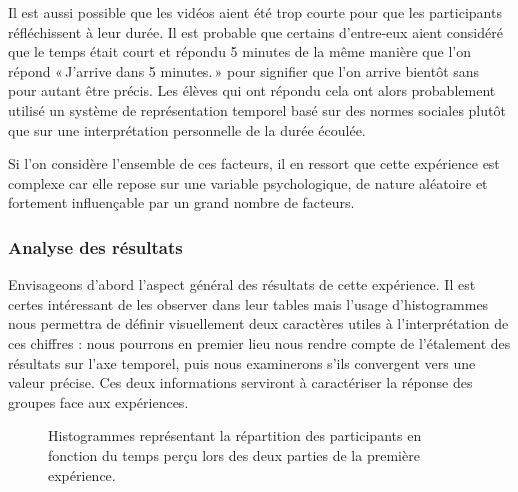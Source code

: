 \documentclass[12pt,fleqn,oneside,openany]{book} %
\begin{document}
Il est aussi possible que les vidéos aient été trop courte pour que les participants réfléchissent à leur durée. Il est probable que certains d'entre-eux aient considéré que le temps était court et répondu 5 minutes de la même manière que l'on répond «\,J'arrive dans 5 minutes.\,» pour signifier que l'on arrive bientôt sans pour autant être précis. Les élèves qui ont répondu cela ont alors probablement utilisé un système de représentation temporel basé sur des normes sociales plutôt que sur une interprétation personnelle de la durée écoulée.

Si l'on considère l'ensemble de ces facteurs, il en ressort que cette expérience est complexe car elle repose sur une variable psychologique, de nature aléatoire et fortement influençable par un grand nombre de facteurs.



\subsubsection{Analyse des résultats} \label{sssec:analyseResult1.1}
Envisageons d'abord l'aspect général des résultats de cette expérience. Il est certes intéressant de les observer dans leur tables mais l'usage d'histogrammes nous permettra de définir visuellement deux caractères utiles à l'interprétation de ces chiffres : nous pourrons en premier lieu nous rendre compte de l'étalement des résultats sur l'axe temporel, puis nous examinerons s'ils convergent vers une valeur précise. Ces deux informations serviront à caractériser la réponse des groupes face aux expériences.

\begin{figure}[h!]
\centering
\begin{minipage}[t]{.49\textwidth}
\end{minipage}
\hfill
\begin{minipage}[t]{.49\textwidth}
\end{minipage}
\caption{Histogrammes représentant la répartition des participants en fonction du temps perçu lors des deux parties de la première expérience.}
\end{figure}
\end{document}
